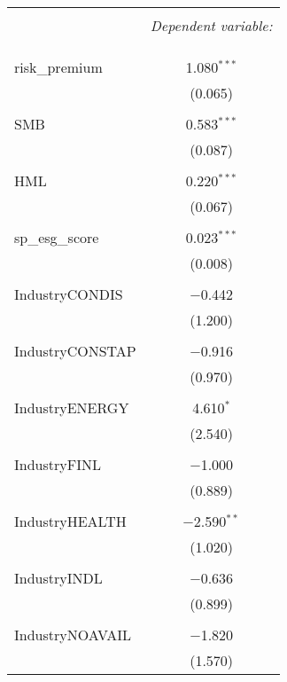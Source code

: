 
\begin{table}[!htbp] \centering 
  \caption{} 
  \label{} 
\begin{tabular}{@{\extracolsep{5pt}}lc} 
\\[-1.8ex]\hline 
\hline \\[-1.8ex] 
 & \multicolumn{1}{c}{\textit{Dependent variable:}} \\ 
\cline{2-2} 
\\[-1.8ex] &   \\ 
\hline \\[-1.8ex] 
 risk\_premium & 1.080$^{***}$ \\ 
  & (0.065) \\ 
  & \\ 
 SMB & 0.583$^{***}$ \\ 
  & (0.087) \\ 
  & \\ 
 HML & 0.220$^{***}$ \\ 
  & (0.067) \\ 
  & \\ 
 sp\_esg\_score & 0.023$^{***}$ \\ 
  & (0.008) \\ 
  & \\ 
 IndustryCONDIS & $-$0.442 \\ 
  & (1.200) \\ 
  & \\ 
 IndustryCONSTAP & $-$0.916 \\ 
  & (0.970) \\ 
  & \\ 
 IndustryENERGY & 4.610$^{*}$ \\ 
  & (2.540) \\ 
  & \\ 
 IndustryFINL & $-$1.000 \\ 
  & (0.889) \\ 
  & \\ 
 IndustryHEALTH & $-$2.590$^{**}$ \\ 
  & (1.020) \\ 
  & \\ 
 IndustryINDL & $-$0.636 \\ 
  & (0.899) \\ 
  & \\ 
 IndustryNOAVAIL & $-$1.820 \\ 
  & (1.570) \\ 

\end{tabular}
\end{table}
